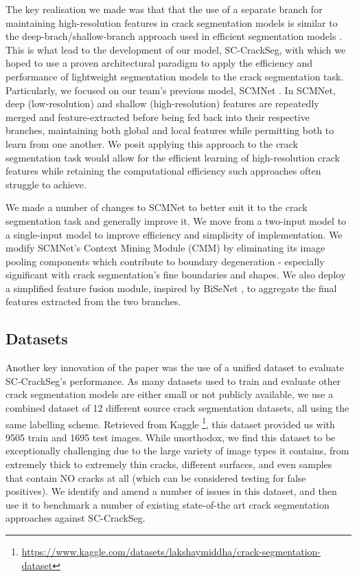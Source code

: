 \documentclass[a4paper,12pt]{report}
\begin{document}
The key realisation we made was that that the use of a separate branch for maintaining high-resolution features in crack segmentation models \cite{nayyeri_multi-resolution_2021} is similar to the deep-brach/shallow-branch approach used in efficient segmentation models \cite{yu_bisenet_2018} \cite{poudel_contextnet_2018}. This is what lead to the development of our model, SC-CrackSeg, with which we hoped to use a proven architectural paradigm to apply the efficiency and performance of lightweight segmentation models to the crack segmentation task. Particularly, we focused on our team's previous model, SCMNet \cite{singha_scmnet_2021}. In SCMNet, deep (low-resolution) and shallow (high-resolution) features are repeatedly merged and feature-extracted before being fed back into their respective branches, maintaining both global and local features while permitting both to learn from one another. We posit applying this approach to the crack segmentation task would allow for the efficient learning of high-resolution crack features while retaining the computational efficiency such approaches often struggle to achieve.

We made a number of changes to SCMNet to better suit it to the crack segmentation task and generally improve it. We move from a two-input model to a single-input model to improve efficiency and simplicity of implementation. We modify SCMNet's Context Mining Module (CMM) by eliminating its image pooling components which contribute to boundary degeneration - especially significant with crack segmentation's fine boundaries and shapes. We also deploy a simplified feature fusion module, inspired by BiSeNet \cite{yu_bisenet_2018}, to aggregate the final features extracted from the two branches.

\subsection{Datasets}
Another key innovation of the paper was the use of a unified dataset to evaluate SC-CrackSeg's performance. As many datasets used to train and evaluate other crack segmentation models are either small or not publicly available, we use a combined dataset of 12 different source crack segmentation datasets, all using the same labelling scheme. Retrieved from Kaggle \footnote{\url{https://www.kaggle.com/datasets/lakshaymiddha/crack-segmentation-dataset}}, this dataset provided us with 9505 train and 1695 test images. While unorthodox, we find this dataset to be exceptionally challenging due to the large variety of image types it contains, from extremely thick to extremely thin cracks, different surfaces, and even samples that contain NO cracks at all (which can be considered testing for false positives). We identify and amend a number of issues in this dataset, and then use it to benchmark a number of existing state-of-the art crack segmentation approaches against SC-CrackSeg.
\end{document}
